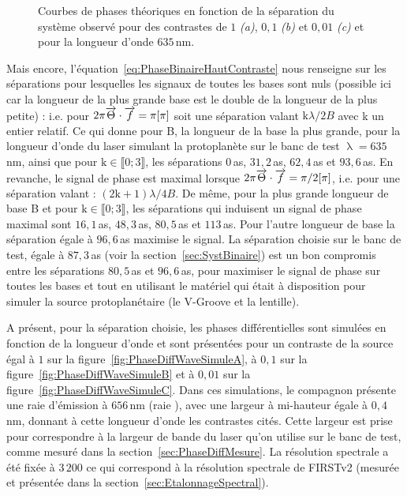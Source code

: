 \begin{figure}[ht!]
\begin{subfigure}{0.5\textwidth}
        \caption{}
        \label{fig:PhaseDiffBinSizeSimuleC}
    \end{subfigure}
    \caption[Courbes de phases théoriques en fonction de la séparation du système observé.]{Courbes de phases théoriques en fonction de la séparation du système observé pour des contrastes de $1$ \textit{(a)}, $0,1$ \textit{(b)} et $0,01$ \textit{(c)} et pour la longueur d'onde $635 \,$nm.}
    \label{fig:PhaseDiffBinSizeSimule}
\end{figure}

Mais encore, l'équation~\ref{eq:PhaseBinaireHautContraste} nous renseigne sur les séparations pour lesquelles les signaux de toutes les bases sont nuls (possible ici car la longueur de la plus grande base est le double de la longueur de la plus petite) : i.e. pour $2\pi \overrightarrow{\Theta} \cdot \overrightarrow{f} = \pi [\pi]$ soit une séparation valant $\text{k} \lambda / 2B$ avec k un entier relatif. Ce qui donne pour B, la longueur de la base la plus grande, pour la longueur d'onde du laser simulant la protoplanète sur le banc de test $\uplambda = 635 \,$nm, ainsi que pour $\text{k} \in \llbracket 0; 3 \rrbracket$, les séparations $0 \,$as, $31,2 \,$as, $62,4 \,$as et $93,6 \,$as. En revanche, le signal de phase est maximal lorsque $2\pi \overrightarrow{\Theta} \cdot \overrightarrow{f} = \pi / 2 [\pi]$, i.e. pour une séparation valant : $(2\text{k}+1) \lambda / 4B$. De même, pour la plus grande longueur de base B et pour $\text{k} \in \llbracket 0; 3 \rrbracket$, les séparations qui induisent un signal de phase maximal sont $16,1 \,$as, $48,3 \,$as, $80,5 \,$as et $113 \,$as. Pour l'autre longueur de base la séparation égale à $96,6 \,$as maximise le signal. La séparation choisie sur le banc de test, égale à $87,3 \,$as (voir la section~\ref{sec:SystBinaire}) est un bon compromis entre les séparations $80,5 \,$as et $96,6 \,$as, pour maximiser le signal de phase sur toutes les bases et tout en utilisant le matériel qui était à disposition pour simuler la source protoplanétaire (le V-Groove et la lentille).

A présent, pour la séparation choisie, les phases différentielles sont simulées en fonction de la longueur d'onde et sont présentées pour un contraste de la source égal à $1$ sur la figure~\ref{fig:PhaseDiffWaveSimuleA}, à $0,1$ sur la figure~\ref{fig:PhaseDiffWaveSimuleB} et à $0,01$ sur la figure~\ref{fig:PhaseDiffWaveSimuleC}. Dans ces simulations, le compagnon présente une raie d'émission à $656 \,$nm (raie \ha), avec une largeur à mi-hauteur égale à $0,4 \,$nm, donnant à cette longueur d'onde les contrastes cités. Cette largeur est prise pour correspondre à la largeur de bande du laser qu'on utilise sur le banc de test, comme mesuré dans la section~\ref{sec:PhaseDiffMesure}. La résolution spectrale a été fixée à $3\,200$ ce qui correspond à la résolution spectrale de \ac{FIRSTv2} (mesurée et présentée dans la section~\ref{sec:EtalonnageSpectral}).

